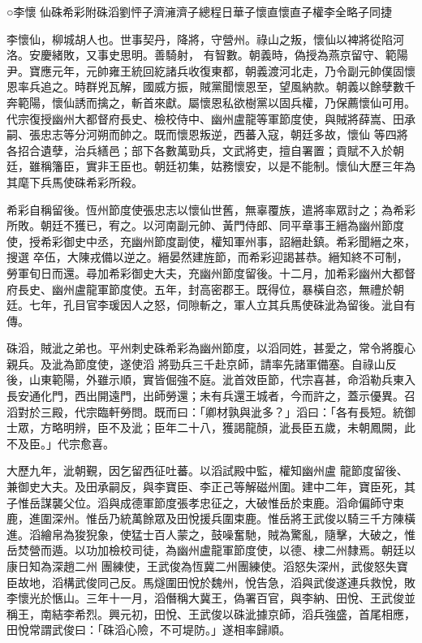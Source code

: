 
\begin{pinyinscope}

 ○李懷
 仙硃希彩附硃滔劉怦子濟澭濟子總程日華子懷直懷直子權李全略子同捷



 李懷仙，柳城胡人也。世事契丹，降將，守營州。祿山之叛，懷仙以裨將從陷河洛。安慶緒敗，又事史思明。善騎射，
 有智數。朝義時，偽授為燕京留守、範陽尹。寶應元年，元帥雍王統回紇諸兵收復東都，朝義渡河北走，乃令副元帥僕固懷恩率兵追之。時群兇瓦解，國威方振，賊黨聞懷恩至，望風納款。朝義以餘孽數千奔範陽，懷仙誘而擒之，斬首來獻。屬懷恩私欲樹黨以固兵權，乃保薦懷仙可用。代宗復授幽州大都督府長史、檢校侍中、幽州盧龍等軍節度使，與賊將薛嵩、田承嗣、張忠志等分河朔而帥之。既而懷恩叛逆，西蕃入寇，朝廷多故，懷仙
 等四將各招合遺孽，治兵繕邑；部下各數萬勁兵，文武將吏，擅自署置；貢賦不入於朝廷，雖稱籓臣，實非王臣也。朝廷初集，姑務懷安，以是不能制。懷仙大歷三年為其麾下兵馬使硃希彩所殺。



 希彩自稱留後。恆州節度使張忠志以懷仙世舊，無辜覆族，遣將率眾討之；為希彩所敗。朝廷不獲已，宥之。以河南副元帥、黃門侍郎、同平章事王縉為幽州節度使，授希彩御史中丞，充幽州節度副使，權知軍州事，詔縉赴鎮。希彩聞縉之來，搜選
 卒伍，大陳戎備以逆之。縉晏然建旌節，而希彩迎謁甚恭。縉知終不可制，勞軍旬日而還。尋加希彩御史大夫，充幽州節度留後。十二月，加希彩幽州大都督府長史、幽州盧龍軍節度使。五年，封高密郡王。既得位，暴橫自恣，無禮於朝廷。七年，孔目官李瑗因人之怒，伺隙斬之，軍人立其兵馬使硃泚為留後。泚自有傳。



 硃滔，賊泚之弟也。平州刺史硃希彩為幽州節度，以滔同姓，甚愛之，常令將腹心親兵。及泚為節度使，遂使滔
 將勁兵三千赴京師，請率先諸軍備塞。自祿山反後，山東範陽，外雖示順，實皆倔強不庭。泚首效臣節，代宗喜甚，命滔勒兵東入長安通化門，西出開遠門，出師勞還；未有兵還王城者，今而許之，蓋示優異。召滔對於三殿，代宗臨軒勞問。既而曰：「卿材孰與泚多？」滔曰：「各有長短。統御士眾，方略明辨，臣不及泚；臣年二十八，獲謁龍顏，泚長臣五歲，未朝鳳闕，此不及臣。」代宗愈喜。



 大歷九年，泚朝覲，因乞留西征吐蕃。以滔試殿中監，權知幽州盧
 龍節度留後、兼御史大夫。及田承嗣反，與李寶臣、李正己等解磁州圍。建中二年，寶臣死，其子惟岳謀襲父位。滔與成德軍節度張孝忠征之，大破惟岳於束鹿。滔命偏師守束鹿，進圍深州。惟岳乃統萬餘眾及田悅援兵圍束鹿。惟岳將王武俊以騎三千方陳橫進。滔繪帛為狻猊象，使猛士百人蒙之，鼓噪奮馳，賊為驚亂，隨擊，大破之，惟岳焚營而遁。以功加檢校司徒，為幽州盧龍軍節度使，以德、棣二州隸焉。朝廷以康日知為深趙二州
 團練使，王武俊為恆冀二州團練使。滔怒失深州，武俊怒失寶臣故地，滔構武俊同己反。馬燧圍田悅於魏州，悅告急，滔與武俊遂連兵救悅，敗李懷光於愜山。三年十一月，滔僭稱大冀王，偽署百官，與李納、田悅、王武俊並稱王，南結李希烈。興元初，田悅、王武俊以硃泚據京師，滔兵強盛，首尾相應，田悅常謂武俊曰：「硃滔心險，不可堤防。」遂相率歸順。




\end{pinyinscope}
